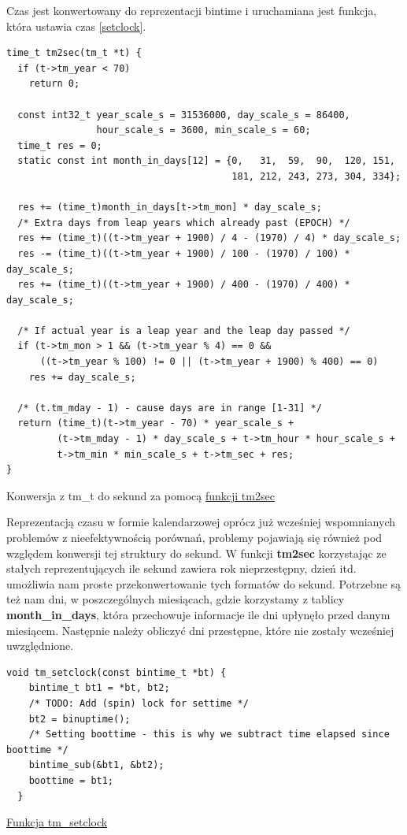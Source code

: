 \documentclass[shortabstract]{iithesis}
\theoremstyle{definition} \newtheorem*{definition}{Definicja}
\theoremstyle{definition} \newtheorem*{example}{Przykład}
\theoremstyle{definition} \newtheorem*{remark}{Uwaga}
\newenvironment{longlisting}{\captionsetup{type=listing}}{}
\begin{document}
Czas jest konwertowany do reprezentacji bintime i uruchamiana jest funkcja, która ustawia czas \ref{setclock}.

\begin{longlisting}
  \begin{verbatim}
time_t tm2sec(tm_t *t) {
  if (t->tm_year < 70)
    return 0;

  const int32_t year_scale_s = 31536000, day_scale_s = 86400,
                hour_scale_s = 3600, min_scale_s = 60;
  time_t res = 0;
  static const int month_in_days[12] = {0,   31,  59,  90,  120, 151,
                                        181, 212, 243, 273, 304, 334};

  res += (time_t)month_in_days[t->tm_mon] * day_scale_s;
  /* Extra days from leap years which already past (EPOCH) */
  res += (time_t)((t->tm_year + 1900) / 4 - (1970) / 4) * day_scale_s;
  res -= (time_t)((t->tm_year + 1900) / 100 - (1970) / 100) * day_scale_s;
  res += (time_t)((t->tm_year + 1900) / 400 - (1970) / 400) * day_scale_s;

  /* If actual year is a leap year and the leap day passed */
  if (t->tm_mon > 1 && (t->tm_year % 4) == 0 &&
      ((t->tm_year % 100) != 0 || (t->tm_year + 1900) % 400) == 0)
    res += day_scale_s;

  /* (t.tm_mday - 1) - cause days are in range [1-31] */
  return (time_t)(t->tm_year - 70) * year_scale_s +
         (t->tm_mday - 1) * day_scale_s + t->tm_hour * hour_scale_s +
         t->tm_min * min_scale_s + t->tm_sec + res;
}
  \end{verbatim}
  \caption{Konwersja z tm\_t do sekund za pomocą \href{https://mimiker.ii.uni.wroc.pl/source/xref/mimiker/sys/kern/time.c?r=9505a819\#124}{funkcji tm2sec}}
  \label{lst:functm2sec}
\end{longlisting}

Reprezentacją czasu w formie kalendarzowej oprócz już wcześniej wspomnianych problemów z nieefektywnością porównań, problemy pojawiają się również pod względem  konwersji tej struktury do sekund. W funkcji \textbf{tm2sec} korzystając ze stałych reprezentujących ile sekund zawiera rok nieprzestępny, dzień itd. umożliwia nam proste przekonwertowanie tych formatów do sekund. Potrzebne są też nam dni, w poszczególnych miesiącach, gdzie korzystamy z tablicy \textbf{month\_in\_days}, która przechowuje informacje ile dni upłynęło przed danym miesiącem. Następnie należy obliczyć dni przestępne, które nie zostały wcześniej uwzględnione.

\begin{longlisting}
  \begin{verbatim}
void tm_setclock(const bintime_t *bt) {
    bintime_t bt1 = *bt, bt2;
    /* TODO: Add (spin) lock for settime */
    bt2 = binuptime();
    /* Setting boottime - this is why we subtract time elapsed since boottime */
    bintime_sub(&bt1, &bt2);
    boottime = bt1;
  }
  \end{verbatim}
  \caption{\href{https://mimiker.ii.uni.wroc.pl/source/xref/mimiker/sys/kern/timer.c?r=3547949d\#110}{Funkcja tm\_setclock}}
  \label{lst:functmsetclock}
\end{longlisting}
\end{document}

